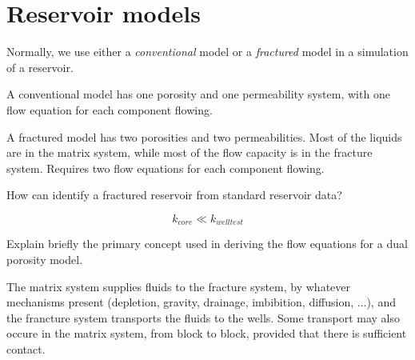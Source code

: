 
\section{Reservoir models} %
\label{sec:reservoir_models}

\begin{question}
  Normally, we use either a \emph{conventional} model or a \emph{fractured} model in a simulation of a reservoir.
\end{question}

A conventional model has one porosity and one permeability system, with one flow equation for each component flowing.

A fractured model has two porosities and two permeabilities. Most of the liquids are in the matrix system, while most of the flow capacity is in the fracture system. Requires two flow equations for each component flowing.

\begin{question}
  How can identify a fractured reservoir from standard reservoir data?
\end{question}

\begin{equation}
  k_{core} \ll k_{welltest}
\end{equation}

\begin{question}
  Explain briefly the primary concept used in deriving the flow equations for a dual porosity model.
\end{question}

The matrix system supplies fluids to the fracture system, by whatever mechanisms present (depletion, gravity, drainage, imbibition, diffusion, ...), and the francture system transports the fluids to the wells. Some transport may also occure in the matrix system, from block to block, provided that there is sufficient contact.

